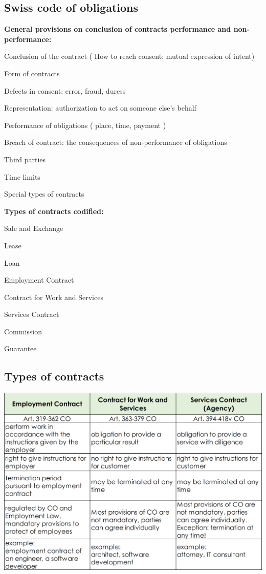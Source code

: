 \subsection{Swiss code of obligations}
\textbf{General provisions on conclusion of contracts performance and non-performance:}
\begin{compactenum}
	\item Conclusion of the contract ( How to reach consent: mutual expression of intent)
	\item Form of contracts
	\item Defects in consent: error, fraud, duress
	\item Representation: authorization to act on someone else’s behalf
	\item Performance of obligations ( place, time, payment )
	\item Breach of contract: the consequences of non-performance of obligations
	\item Third parties
	\item Time limits
	\item Special types of contracts
\end{compactenum}
\textbf{Types of contracts codified:}
\begin{compactitem}
	\item Sale and Exchange
	\item Lease
	\item Loan
	\item Employment Contract
	\item Contract for Work and Services
	\item Services Contract
	\item Commission
	\item Guarantee
\end{compactitem}

\subsection{Types of contracts}
\includegraphics[width=1\linewidth]{images/typesofcontract}

